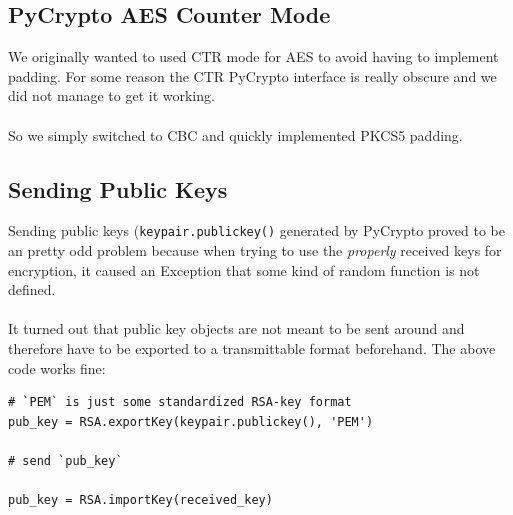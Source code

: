 \documentclass[11pt, a4paper]{article}
\begin{document}
\subsection{PyCrypto AES Counter Mode}

We originally wanted to used CTR mode for AES to avoid having to implement
padding. For some reason the CTR PyCrypto interface is really obscure and we
did not manage to get it working.
\\\\
So we simply switched to CBC and quickly implemented PKCS5 padding.

\subsection{Sending Public Keys}

Sending public keys (\lstinline{keypair.publickey()} generated by PyCrypto
proved to be an pretty odd problem because when trying to use the
\textit{properly} received keys for encryption, it caused an Exception that
some kind of random function is not defined.
\\\\
It turned out that public key objects are not meant to be sent around and
therefore have to be exported to a transmittable format beforehand. The above
code works fine:

\begin{lstlisting}
# `PEM` is just some standardized RSA-key format
pub_key = RSA.exportKey(keypair.publickey(), 'PEM')

# send `pub_key`

pub_key = RSA.importKey(received_key)
\end{lstlisting}

\nocite{*}


\end{document}
